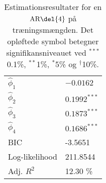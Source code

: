 \begin{table}[h]
\center
\begin{tabular}{ll}
\toprule
$\widehat{\phi}_1$ &$ -0.0162 $ \\
$\widehat{\phi}_2$ & $0.1992^{***}$  \\
$\widehat{\phi}_3$ &$0.1873^{***}$  \\
$\widehat{\phi}_4$ &$0.1686^{***} $ \\ \midrule
BIC & -3.5651 \\
Log-likelihood &  211.8544\\ 
Adj. $R^2$ & 12.30 \% \\ \bottomrule
 \end{tabular}
\caption{Estimationsresultater for en \(\text{AR} \del{4}\) på træningsmængden. Det opløftede symbol betegner signifikansniveauet ved $^{***}$0.1\%, $^{**}$1\%, $^{*}$5\% og $^{\dagger}$10\%.} \label{tab:est_ar}
\end{table}